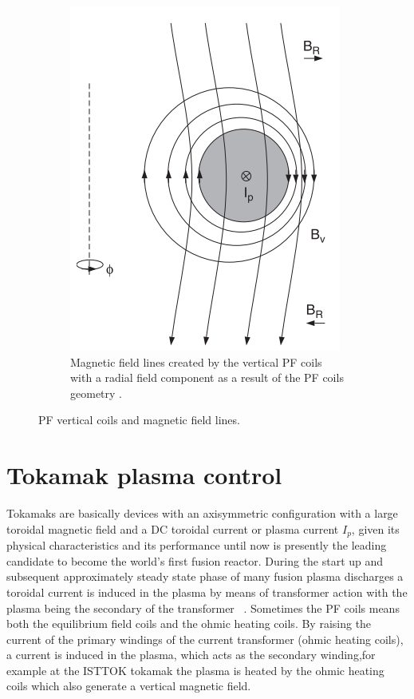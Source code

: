 \begin{figure}
\begin{subfigure}[b]{0.39\textwidth}
  		\includegraphics[width=\textwidth]{Chp1/horizontalField.png}
  		\caption{ Magnetic field lines created by the vertical PF coils with a radial field component as a result of the PF coils geometry \cite[Chapter~4]{Zohm2015}. \label{}    }
  	\end{subfigure}
  	\caption{ PF vertical coils and magnetic field lines.\label{PFcoils} }
  \end{figure}
  
  
  
\section{Tokamak plasma control}

Tokamaks are basically devices with an axisymmetric configuration with a large toroidal magnetic field and a DC toroidal current or plasma current $I_p$, given its physical characteristics and its performance until now is presently the leading candidate to become the world’s first fusion reactor. During the start up and subsequent approximately steady state phase of many fusion plasma discharges a toroidal current is induced in the plasma by means of transformer action with the plasma being the secondary of the transformer  ~\cite[Chapter~9]{Freidberg2007}. Sometimes the PF coils means both the equilibrium field coils and the ohmic heating coils. By raising the current of the primary windings of the current transformer (ohmic heating coils), a current is induced in the plasma, which acts as the secondary winding,for example at the ISTTOK tokamak the plasma is heated by the ohmic heating coils which also generate a vertical magnetic field. \smallskip

